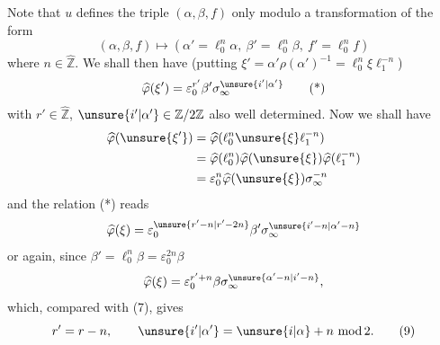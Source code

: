 Note that $u$ defines the triple $(\alpha,\beta,f)$ only modulo
a transformation of the form
\[
(\alpha,\beta,f)\longmapsto
(\alpha'=\ell_0^n\alpha,\ \beta'=\ell_0^n\beta,\ f'=\ell_0^n f)
\tag{8}
\]
where $n\in\widehat{\mathbb Z}$. We shall then have (putting
$\xi'=\alpha'\rho(\alpha')^{-1}=\ell_0^n\xi\ell_1^{-n}$)
\[
\widehat\varphi(\xi')=\varepsilon_0^{r'}\beta'
\sigma_\infty^{\unsure{i'|\alpha'}}
\tag{*}
\]
with $r'\in\widehat{\mathbb Z}$,
$\unsure{i'|\alpha'}\in\mathbb Z/2\mathbb Z$ also well determined.
Now we shall have
\[
\begin{aligned}
\widehat\varphi(\unsure{\xi'})
 &=\widehat\varphi(\ell_0^n\unsure{\xi}\ell_1^{-n})\\
 &=\widehat\varphi(\ell_0^n)\widehat\varphi(\unsure{\xi})
   \widehat\varphi(\ell_1^{-n})\\
 &=\varepsilon_0^n\widehat\varphi(\unsure{\xi})\sigma_\infty^{-n}
\end{aligned}
\]
and the relation (*) reads
\[
\widehat\varphi(\xi)=\varepsilon_0^{\unsure{r'-n|r'-2n}}\beta'
\sigma_\infty^{\unsure{i'-n|\alpha'-n}}
\]
or again, since $\beta'=\ell_0^n\beta=\varepsilon_0^{2n}\beta$
\[
\widehat\varphi(\xi)=\varepsilon_0^{r'+n}\beta
\sigma_\infty^{\unsure{\alpha'-n|i'-n}},
\]
which, compared with (7), gives
\[
r'=r-n,\qquad\unsure{i'|\alpha'}=\unsure{i|\alpha}+n\ \mathrm{mod}\,2.
\tag{9}
\]
